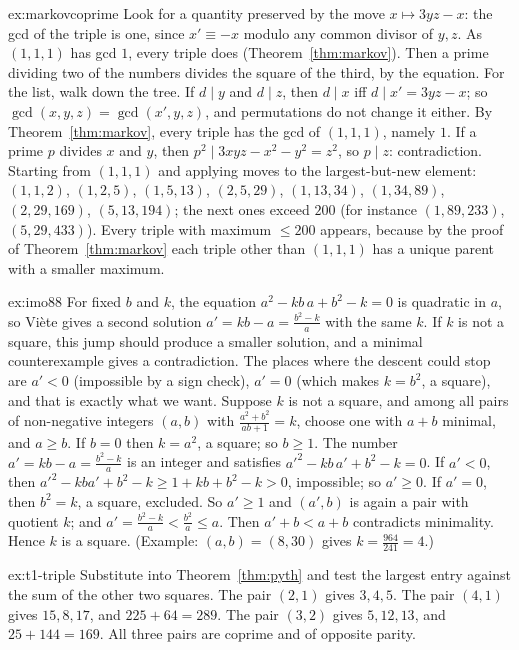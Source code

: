 \begin{solution}{ex:markovcoprime}
\idea Look for a quantity preserved by the move $x\mapsto3yz-x$: the gcd of the triple is one, since $x'\equiv-x$ modulo any common divisor of $y,z$. As $(1,1,1)$ has gcd $1$, every triple does (Theorem~\ref{thm:markov}). Then a prime dividing two of the numbers divides the square of the third, by the equation. For the list, walk down the tree.
\writeup If $d\mid y$ and $d\mid z$, then $d\mid x$ iff $d\mid x'=3yz-x$; so $\gcd(x,y,z)=\gcd(x',y,z)$, and permutations do not change it either. By Theorem~\ref{thm:markov}, every triple has the gcd of $(1,1,1)$, namely $1$. If a prime $p$ divides $x$ and $y$, then $p^2\mid3xyz-x^2-y^2=z^2$, so $p\mid z$: contradiction. Starting from $(1,1,1)$ and applying moves to the largest-but-new element: $(1,1,2)$, $(1,2,5)$, $(1,5,13)$, $(2,5,29)$, $(1,13,34)$, $(1,34,89)$, $(2,29,169)$, $(5,13,194)$; the next ones exceed $200$ (for instance $(1,89,233)$, $(5,29,433)$). Every triple with maximum $\le200$ appears, because by the proof of Theorem~\ref{thm:markov} each triple other than $(1,1,1)$ has a unique parent with a smaller maximum.
\end{solution}

\begin{solution}{ex:imo88}
\idea For fixed $b$ and $k$, the equation $a^2-kb\,a+b^2-k=0$ is quadratic in $a$, so Vi\`ete gives a second solution $a'=kb-a=\frac{b^2-k}a$ with the same $k$. If $k$ is not a square, this jump should produce a smaller solution, and a minimal counterexample gives a contradiction. The places where the descent could stop are $a'<0$ (impossible by a sign check), $a'=0$ (which makes $k=b^2$, a square), and that is exactly what we want.
\writeup Suppose $k$ is not a square, and among all pairs of non-negative integers $(a,b)$ with $\frac{a^2+b^2}{ab+1}=k$, choose one with $a+b$ minimal, and $a\ge b$. If $b=0$ then $k=a^2$, a square; so $b\ge1$. The number $a'=kb-a=\frac{b^2-k}a$ is an integer and satisfies $a'^2-kb\,a'+b^2-k=0$. If $a'<0$, then $a'^2-kba'+b^2-k\ge1+kb+b^2-k>0$, impossible; so $a'\ge0$. If $a'=0$, then $b^2=k$, a square, excluded. So $a'\ge1$ and $(a',b)$ is again a pair with quotient $k$; and $a'=\frac{b^2-k}a<\frac{b^2}a\le a$. Then $a'+b<a+b$ contradicts minimality. Hence $k$ is a square. (Example: $(a,b)=(8,30)$ gives $k=\frac{964}{241}=4$.)
\end{solution}

\begin{solution}{ex:t1-triple}
\idea Substitute into Theorem~\ref{thm:pyth} and test the largest entry against the sum of the other two squares.
\writeup The pair $(2,1)$ gives $3,4,5$. The pair $(4,1)$ gives $15,8,17$, and $225+64=289$. The pair $(3,2)$ gives $5,12,13$, and $25+144=169$. All three pairs are coprime and of opposite parity.
\end{solution}

